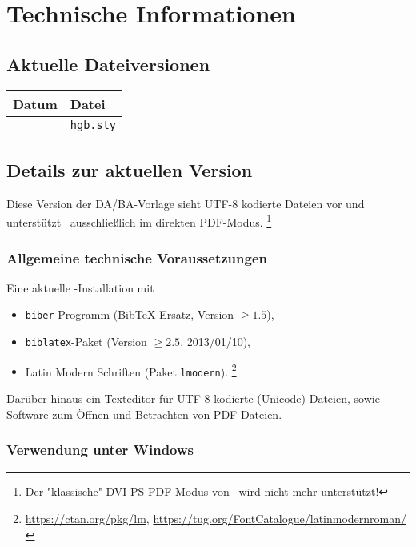 \chapter{Technische Informationen}
\label{app:TechnicalDetails}

\newcommand*{\checkbox}{{\fboxsep 1pt%
\framebox[1.30\height]{\vphantom{M}\checkmark}}}

\section{Aktuelle Dateiversionen}

\begin{center}
	\begin{tabular}{@{}ll@{}}
		\toprule
		Datum    & Datei            \\
		\midrule
		\hgbDate & \texttt{hgb.sty} \\
		\bottomrule
	\end{tabular}
\end{center}


\section{Details zur aktuellen Version}


Diese Version der DA/BA-Vorlage sieht \mbox{UTF-8} kodierte Dateien vor und
unterstützt \latex\ ausschließlich im direkten PDF-Modus.%
\footnote{Der "klassische" DVI-PS-PDF-Modus von \latex\ wird nicht mehr
unterstützt!}

\subsection{Allgemeine technische Voraussetzungen}

Eine aktuelle \latex-Installation mit
%
\begin{itemize}
		\item \texttt{biber}-Programm (BibTeX-Ersatz, Version $\geq 1.5$),
		\item \texttt{biblatex}-Paket (Version $\geq 2.5$, 2013/01/10),
		\item Latin Modern Schriften (Paket \texttt{lmodern}).%
			\footnote{\url{https://ctan.org/pkg/lm},
				\url{https://tug.org/FontCatalogue/latinmodernroman/}}
\end{itemize}
%
Darüber hinaus ein Texteditor für \mbox{UTF-8} kodierte (Unicode) Dateien,
sowie Software zum Öffnen und Betrachten von PDF-Dateien.


\subsection{Verwendung unter Windows}
\label{sec:VerwendungUnterWindows}

